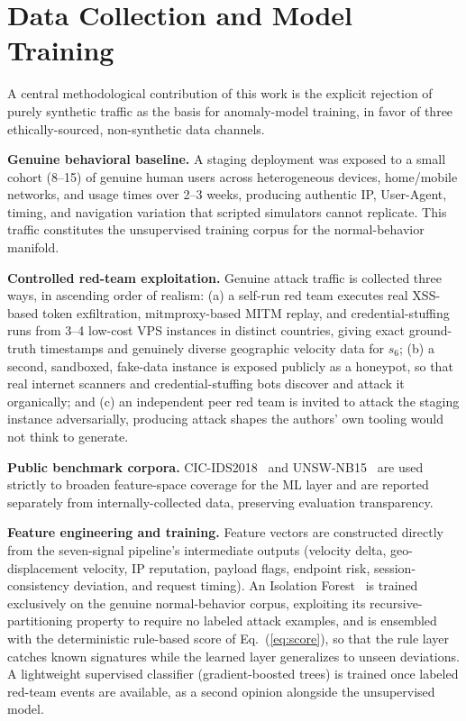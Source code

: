 \documentclass[conference]{IEEEtran}
\begin{document}
\section{Data Collection and Model Training}
A central methodological contribution of this work is the explicit rejection of purely synthetic traffic as the basis for anomaly-model training, in favor of three ethically-sourced, non-synthetic data channels.

\textbf{Genuine behavioral baseline.} A staging deployment was exposed to a small cohort (8--15) of genuine human users across heterogeneous devices, home/mobile networks, and usage times over 2--3 weeks, producing authentic IP, User-Agent, timing, and navigation variation that scripted simulators cannot replicate. This traffic constitutes the unsupervised training corpus for the normal-behavior manifold.

\textbf{Controlled red-team exploitation.} Genuine attack traffic is collected three ways, in ascending order of realism: (a) a self-run red team executes real XSS-based token exfiltration, mitmproxy-based MITM replay, and credential-stuffing runs from 3--4 low-cost VPS instances in distinct countries, giving exact ground-truth timestamps and genuinely diverse geographic velocity data for $s_6$; (b) a second, sandboxed, fake-data instance is exposed publicly as a honeypot, so that real internet scanners and credential-stuffing bots discover and attack it organically; and (c) an independent peer red team is invited to attack the staging instance adversarially, producing attack shapes the authors' own tooling would not think to generate.

\textbf{Public benchmark corpora.} CIC-IDS2018~\cite{sharafaldin2018ids2018} and UNSW-NB15~\cite{moustafa2015unsw} are used strictly to broaden feature-space coverage for the ML layer and are reported separately from internally-collected data, preserving evaluation transparency.

\textbf{Feature engineering and training.} Feature vectors are constructed directly from the seven-signal pipeline's intermediate outputs (velocity delta, geo-displacement velocity, IP reputation, payload flags, endpoint risk, session-consistency deviation, and request timing). An Isolation Forest~\cite{liu2008isolation} is trained exclusively on the genuine normal-behavior corpus, exploiting its recursive-partitioning property to require no labeled attack examples, and is ensembled with the deterministic rule-based score of Eq.~(\ref{eq:score}), so that the rule layer catches known signatures while the learned layer generalizes to unseen deviations. A lightweight supervised classifier (gradient-boosted trees) is trained once labeled red-team events are available, as a second opinion alongside the unsupervised model.
\end{document}
